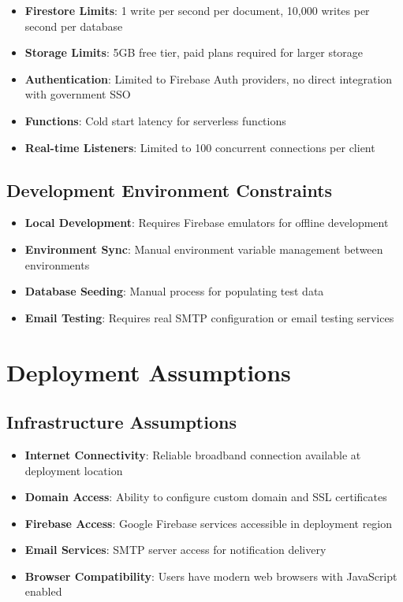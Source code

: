 \documentclass[12pt,a4paper]{article}
\begin{document}
\begin{itemize}[leftmargin=*]
    \item \textbf{Firestore Limits}: 1 write per second per document, 10,000 writes per second per database
    \item \textbf{Storage Limits}: 5GB free tier, paid plans required for larger storage
    \item \textbf{Authentication}: Limited to Firebase Auth providers, no direct integration with government SSO
    \item \textbf{Functions}: Cold start latency for serverless functions
    \item \textbf{Real-time Listeners}: Limited to 100 concurrent connections per client
\end{itemize}

\subsection{Development Environment Constraints}

\begin{itemize}[leftmargin=*]
    \item \textbf{Local Development}: Requires Firebase emulators for offline development
    \item \textbf{Environment Sync}: Manual environment variable management between environments
    \item \textbf{Database Seeding}: Manual process for populating test data
    \item \textbf{Email Testing}: Requires real SMTP configuration or email testing services
\end{itemize}

\section{Deployment Assumptions}

\subsection{Infrastructure Assumptions}

\begin{itemize}[leftmargin=*]
    \item \textbf{Internet Connectivity}: Reliable broadband connection available at deployment location
    \item \textbf{Domain Access}: Ability to configure custom domain and SSL certificates
    \item \textbf{Firebase Access}: Google Firebase services accessible in deployment region
    \item \textbf{Email Services}: SMTP server access for notification delivery
    \item \textbf{Browser Compatibility}: Users have modern web browsers with JavaScript enabled
\end{itemize}
\end{document}
